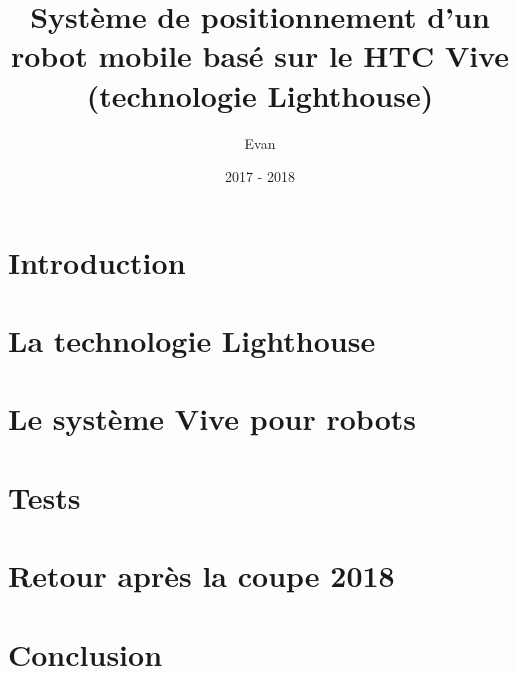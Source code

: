 ﻿\documentclass[10pt,a4paper,french]{report}
\title{Système de positionnement d'un robot mobile basé sur le HTC Vive (technologie Lighthouse)}
\author{Evan \bsc{Roué}}
\date{2017 - 2018}
\begin{document}
\maketitle



\tableofcontents

\thispagestyle{empty}
\setcounter{page}{0}

\chapter{Introduction}


\chapter{La technologie Lighthouse}


\chapter{Le système Vive pour robots}


\chapter{Tests}


\chapter{Retour après la coupe 2018}


\chapter{Conclusion}

\end{document}
